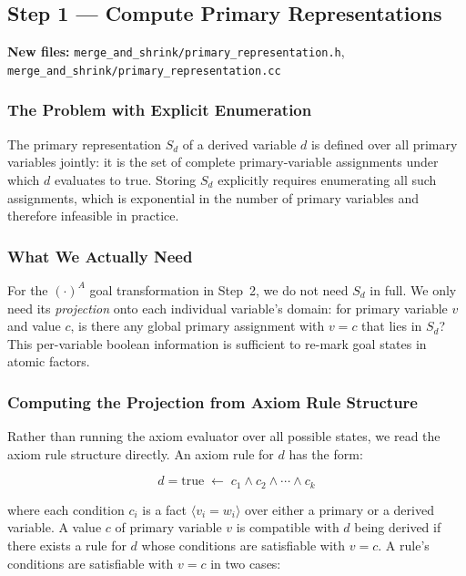 \documentclass[11pt,a4paper]{article}
\begin{document}
\subsection{Step 1 — Compute Primary Representations}
\textbf{New files:} \texttt{merge\_and\_shrink/primary\_representation.h},
\texttt{merge\_and\_shrink/primary\_representation.cc}

\subsubsection{The Problem with Explicit Enumeration}

The primary representation $S_d$ of a derived variable $d$ is defined over
all primary variables jointly: it is the set of complete primary-variable
assignments under which $d$ evaluates to true.  Storing $S_d$ explicitly
requires enumerating all such assignments, which is exponential in the number
of primary variables and therefore infeasible in practice.

\subsubsection{What We Actually Need}

For the $(\cdot)^A$ goal transformation in Step~2, we do not need $S_d$ in
full.  We only need its \emph{projection} onto each individual variable's
domain: for primary variable $v$ and value $c$, is there any global primary
assignment with $v = c$ that lies in $S_d$?  This per-variable boolean
information is sufficient to re-mark goal states in atomic factors.

\subsubsection{Computing the Projection from Axiom Rule Structure}

Rather than running the axiom evaluator over all possible states, we read the
axiom rule structure directly.  An axiom rule for $d$ has the form:

\[
  d = \text{true} \;\leftarrow\; c_1 \wedge c_2 \wedge \cdots \wedge c_k
\]

where each condition $c_i$ is a fact $\langle v_i = w_i \rangle$ over either
a primary or a derived variable.  A value $c$ of primary variable $v$ is
compatible with $d$ being derived if there exists a rule for $d$ whose
conditions are satisfiable with $v = c$.  A rule's conditions are satisfiable
with $v = c$ in two cases:
\end{document}
